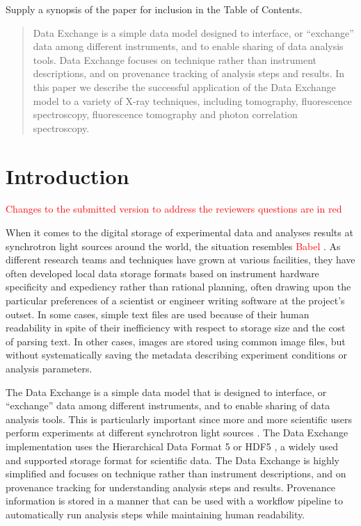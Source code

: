 \documentclass[pdf]{iucr}              %
\begin{document}

\maketitle                        %

\begin{synopsis}
Supply a synopsis of the paper for inclusion in the Table of Contents.
\end{synopsis}

\begin{abstract}
Data Exchange is a simple data model designed to interface, or ``exchange'' data among different instruments, and to enable sharing of data analysis tools. Data Exchange focuses on technique rather than instrument descriptions, and on provenance tracking of analysis steps and results. In this paper we describe the successful application of the Data Exchange model to a variety of X-ray techniques, including tomography, fluorescence spectroscopy, fluorescence tomography and photon correlation spectroscopy.
\end{abstract}


\section{Introduction}


\textcolor{red}{Changes to the submitted version to address the reviewers questions are in red}

When it comes to the digital storage of experimental data and analyses results at synchrotron light sources around the world, the situation resembles \textcolor{red}{Babel \cite{genesis}}. As different research teams and techniques have grown at various facilities, they have often developed local data storage formats based on instrument hardware specificity and expediency rather than rational planning, often drawing upon the particular preferences of a scientist or engineer writing software at the project's outset. In some cases, simple text files are used because of their human readability in spite of their inefficiency with respect to storage size and the cost of parsing text. In other cases, images are stored using common image files, but without systematically saving the metadata describing experiment conditions or analysis parameters.

The Data Exchange is a simple data model that is designed to interface, or ``exchange'' data among different instruments, and to enable sharing of data analysis tools. This is particularly important since more and more scientific users perform experiments at different synchrotron light sources \cite{Kanitpanyacharoen}. The Data Exchange implementation uses the Hierarchical Data Format 5 or HDF5 \cite{HDF5}, a widely used and supported storage format for scientific data. The Data Exchange is highly simplified and focuses on technique rather than instrument descriptions, and on provenance tracking for understanding analysis steps and results. Provenance information is stored in a manner that can be used with a workflow pipeline to automatically run analysis steps while maintaining human readability.
\end{document}
